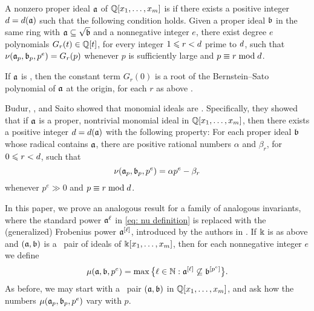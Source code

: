 \documentclass{article}
\begin{document}
\begin{definition}
   \label{defn: nuCool}
   A nonzero proper ideal $\mathfrak{a}$ of $\mathbb{Q}[x_1,\ldots,x_m]$ is \emph{\nuCool} if there exists a positive integer $d = d(\mathfrak{a})$ such that the following condition holds.
   Given a proper ideal $\mathfrak{b}$ in the same ring with $\mathfrak{a} \subseteq \sqrt {\mathfrak{b}}$ and a nonnegative integer $e$, there exist degree $e$ polynomials $G_r(t) \in \mathbb{Q}[t]$, for every integer $1 \leqslant r < d$ prime to $d$, such that $\nu(\mathfrak{a}_p, \mathfrak{b}_p, p^e) = G_r(p)$ whenever $p$ is sufficiently large and $p \equiv r \bmod d$.
\end{definition}

If $\mathfrak{a}$ is \nuCool, then the constant term $G_r(0)$ is a root of the Bernstein--Sato polynomial of $\mathfrak{a}$ at the origin, for each $r$ as above \cite[Remark~3.13]{mustata+takagi+watanabe.F-thresholds}.

\smallskip

Budur, \mustata, and Saito showed that monomial ideals are \nuCool \cite[Theorem~4.1]{budur+mustata+saito.roots_bs_polys_monomial}.
Specifically, they showed that if $\mathfrak{a}$ is a proper, nontrivial monomial ideal in $\mathbb{Q}[x_1,\ldots,x_m]$, then there exists a positive integer $d = d(\mathfrak{a})$ with the following property:
For each proper ideal $\mathfrak{b}$ whose radical contains $\mathfrak{a}$, there are positive rational numbers $\alpha$ and $\beta_r$, for $0 \leqslant r < d$, such that
\begin{equation}
   \label{eq: nu-uniformity for monomial ideals}
   \nu(\mathfrak{a}_p, \mathfrak{b}_p, p^e) = \alpha p^e - \beta_r
\end{equation}
whenever $p^e \gg 0$ and $p \equiv r \bmod d$.

In this paper, we prove an analogous result for a family of analogous invariants, where the standard power $\mathfrak{a}^\ell$ in \eqref{eq: nu definition} is replaced with the (generalized) Frobenius power $\mathfrak{a}^{[\ell]}$, introduced by the authors in \cite{hernandez+etal.frobenius_powers}.
If $\Bbbk$ is as above and $(\mathfrak{a},\mathfrak{b})$ is a \compatible\ pair of ideals of $\Bbbk[x_1, \ldots, x_m]$, then for each nonnegative integer $e$ we define
\[\mu(\mathfrak{a},\mathfrak{b},p^e) = \max\big\{\ell\in \mathbb{N} : \mathfrak{a}^{[\ell]} \not\subseteq \mathfrak{b}^{[p^e]}\big\}.\]
As before, we may start with a \compatible\ pair $(\mathfrak{a},\mathfrak{b})$ in $\mathbb{Q}[x_1,\ldots,x_m]$, and ask how the numbers $\mu(\mathfrak{a}_p,\mathfrak{b}_p,p^e)$ vary with $p$.
\end{document}
